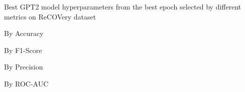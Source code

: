 \begin{table}[!htbp]
    \caption{Best GPT2 model hyperparameters from the best epoch selected by different metrics on ReCOVery dataset}
    \label{tab:recovery_gpt2_hparams}
    \centering

    \begin{subtable}[t]{0.48\linewidth}
        \scriptsize
        \caption{By Accuracy}
        
    \end{subtable}
    \hfill
    \begin{subtable}[t]{0.48\linewidth}
        \scriptsize
        \caption{By F1-Score}
        
    \end{subtable}

    \vspace{1em}

    \begin{subtable}[t]{0.48\linewidth}
        \scriptsize
        \caption{By Precision}
        
    \end{subtable}
    \hfill
    \begin{subtable}[t]{0.48\linewidth}
        \scriptsize
        \caption{By ROC-AUC}
        
    \end{subtable}


\end{table}